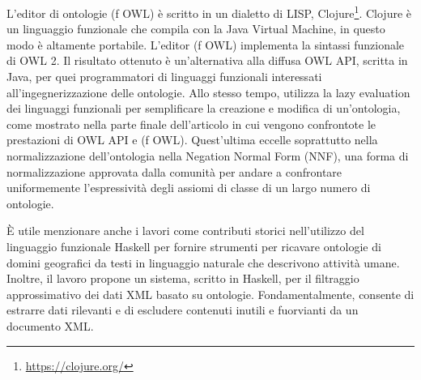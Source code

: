 L'editor di ontologie (f OWL) \cite{fOWL} è scritto in un dialetto di LISP, Clojure\footnote{\url{https://clojure.org/}}. Clojure è un linguaggio funzionale che compila con la Java Virtual Machine, in questo modo è altamente portabile. L'editor (f OWL) implementa la sintassi funzionale di OWL 2. Il risultato ottenuto è un'alternativa alla diffusa OWL API, scritta in Java, per quei programmatori di linguaggi funzionali interessati all'ingegnerizzazione delle ontologie. Allo stesso tempo, utilizza la lazy evaluation dei linguaggi funzionali per semplificare la creazione e modifica di un'ontologia, come mostrato nella parte finale dell'articolo in cui vengono confrontote le prestazioni di OWL API e (f OWL). Quest'ultima eccelle soprattutto nella normalizzazione dell'ontologia nella Negation Normal Form (NNF), una forma di normalizzazione approvata dalla comunità per andare a confrontare uniformemente l'espressività degli assiomi di classe di un largo numero di ontologie.


\noindent
È utile menzionare anche i lavori \cite{khun1995ontology, kuhngeo2001} come contributi storici nell'utilizzo del linguaggio funzionale Haskell \cite{o2008real} per fornire strumenti per ricavare ontologie di domini geografici da testi in linguaggio naturale che descrivono attività umane. Inoltre, il lavoro \cite{baggi2008XMLFiltering} propone un sistema, scritto in Haskell, per il filtraggio approssimativo dei dati XML basato su ontologie. Fondamentalmente, consente di estrarre dati rilevanti e di escludere contenuti inutili e fuorvianti da un documento XML.


